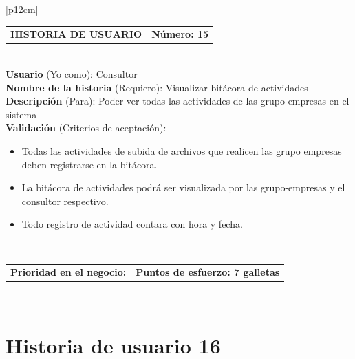 \documentclass[11pt,letterpaper]{report}
\begin{document}
	\begin{center}	
		\begin{tabular}{|p{12cm}|}
			\hline
			\begin{tabular}{c|c}
				\textbf{HISTORIA DE USUARIO} & \textbf{Número: 15} \\
			\end{tabular} \\ \hline
			\textbf{Usuario} (Yo como): Consultor \\ \hline
			\textbf{Nombre de la historia} (Requiero): Visualizar bitácora de actividades\\ \hline
			\textbf{Descripción} (Para): Poder ver todas las actividades de las grupo empresas en el sistema \\ \hline
			\textbf{Validación} (Criterios de aceptación): \\
			\begin{minipage}{12cm}
				\begin{itemize}
					\item Todas las actividades de subida de archivos que realicen las grupo empresas deben registrarse en la bitácora.
					\item La bitácora de actividades podrá ser visualizada por las grupo-empresas y el consultor respectivo.
					\item Todo registro de actividad contara con hora y fecha.
				\end{itemize}
			\end{minipage} \\ \hline
			\begin{tabular}{p{6cm}|c}
				\textbf{Prioridad en el negocio: } & \textbf{Puntos de esfuerzo: 7 galletas} \\
			\end{tabular} \\ \hline
		\end{tabular}
	\end{center}
	
	\section{Historia de usuario 16}
	
\end{document}
